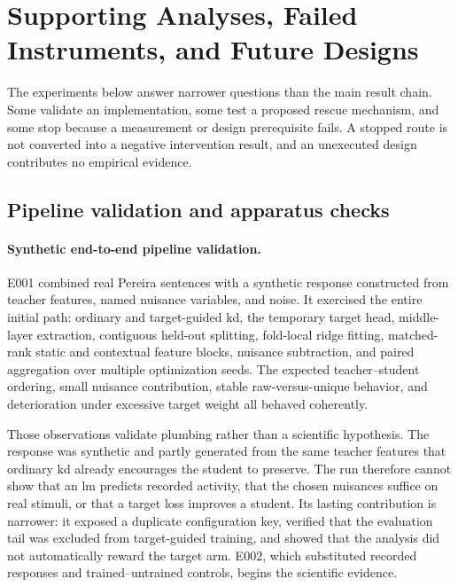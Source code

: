 \section{Supporting Analyses, Failed Instruments, and Future Designs}
\label{app:secondary}

The experiments below answer narrower questions than the main result chain.
Some validate an implementation, some test a proposed rescue mechanism, and some stop because a measurement or design prerequisite fails.
A stopped route is not converted into a negative intervention result, and an unexecuted design contributes no empirical evidence.

\subsection{Pipeline validation and apparatus checks}

\paragraph{Synthetic end-to-end pipeline validation.}
E001 combined real Pereira sentences \autocite{pereira2018} with a synthetic response constructed from teacher features, named nuisance variables, and noise.
It exercised the entire initial path: ordinary and target-guided \ac{kd}, the temporary target head, middle-layer extraction, contiguous held-out splitting, fold-local ridge fitting, matched-rank static and contextual feature blocks, nuisance subtraction, and paired aggregation over multiple optimization seeds.
The expected teacher--student ordering, small nuisance contribution, stable raw-versus-unique behavior, and deterioration under excessive target weight all behaved coherently. 

Those observations validate plumbing rather than a scientific hypothesis.
The response was synthetic and partly generated from the same teacher features that ordinary \ac{kd} already encourages the student to preserve.
The run therefore cannot show that an \ac{lm} predicts recorded activity, that the chosen nuisances suffice on real stimuli, or that a target loss improves a student.
Its lasting contribution is narrower: it exposed a duplicate configuration key, verified that the evaluation tail was excluded from target-guided training, and showed that the analysis did not automatically reward the target arm.
E002, which substituted recorded responses and trained--untrained controls, begins the scientific evidence.

